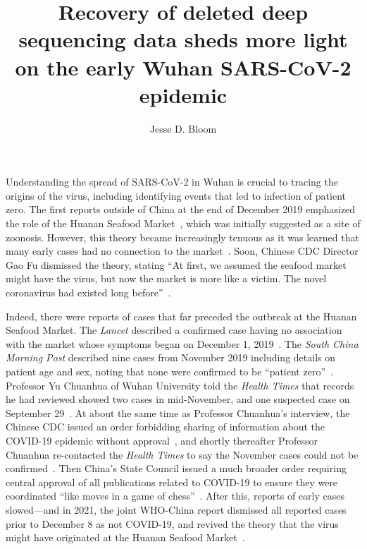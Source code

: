 \documentclass[9pt,twocolumn,twoside]{gsajnl_modified}
\title{Recovery of deleted deep sequencing data sheds more light on the early Wuhan SARS-CoV-2 epidemic}
\author[]{\Large Jesse D. Bloom}
\affil[]{Fred Hutchinson Cancer Research Center}
\affil[]{Howard Hughes Medical Institute}
\affil[]{Seattle, WA, USA}
\begin{document}
\maketitle
\thispagestyle{firststyle}
\firstpagefootnote

\vspace{-33pt}%

\lettrine[lines=2]{\color{color2}U}{}nderstanding the spread of SARS-CoV-2 in Wuhan is crucial to tracing the origins of the virus, including identifying events that led to infection of patient zero.
The first reports outside of China at the end of December 2019 emphasized the role of the Huanan Seafood Market~\citep{ProMED2109}, which was initially suggested as a site of zoonosis.
However, this theory became increasingly tenuous as it was learned that many early cases had no connection to the market~\citep{huang2020clinical, chen2020epidemiological}.
Soon, Chinese CDC Director Gao Fu dismissed the theory, stating ``At first, we assumed the seafood market might have the virus, but now the market is more like a victim.
The novel coronavirus had existed long before''~\citep{GlobalTimes2020}.

Indeed, there were reports of cases that far preceded the outbreak at the Huanan Seafood Market.
The \textit{Lancet} described a confirmed case having no association with the market whose symptoms began on December 1, 2019~\citep{huang2020clinical}.
The \textit{South China Morning Post} described nine cases from November 2019 including details on patient age and sex, noting that none were confirmed to be ``patient zero''~\citep{ma2020SCMP}.
Professor Yu Chuanhua of Wuhan University told the \textit{Health Times} that records he had reviewed showed two cases in mid-November, and one suspected case on September 29~\citep{healthtimes2020}.
At about the same time as Professor Chuanhua's interview, the Chinese CDC issued an order forbidding sharing of information about the COVID-19 epidemic without approval~\citep{chinacdc2020}, and shortly thereafter Professor Chuanhua re-contacted the \textit{Health Times} to say the November cases could not be confirmed~\citep{healthtimes2020}.
Then China's State Council issued a much broader order requiring central approval of all publications related to COVID-19 to ensure they were coordinated ``like moves in a game of chess''~\citep{Kang2020}.
After this, reports of early cases slowed---and in 2021, the joint WHO-China report dismissed all reported cases prior to December 8 as not COVID-19, and revived the theory that the virus might have originated at the Huanan Seafood Market~\citep{WHO2021origins}.
\end{document}
